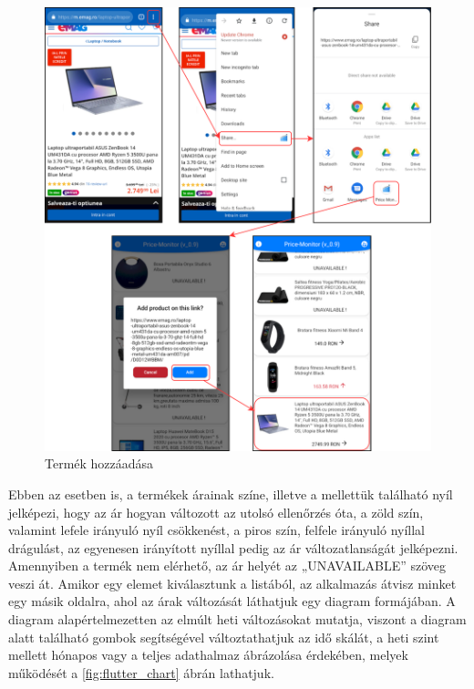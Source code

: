 \begin{figure}[H]
    \centering
    \includegraphics[scale=1]{figures/images/flutter_add.png}
    \caption{Termék hozzáadása}
    \label{fig:flutter_add}
\end{figure}

Ebben az esetben is, a termékek árainak színe, illetve a mellettük található nyíl jelképezi, hogy az ár hogyan változott az utolsó ellenőrzés óta, a zöld szín, valamint lefele irányuló nyíl csökkenést, a piros szín, felfele irányuló nyíllal drágulást, az egyenesen irányított nyíllal pedig az ár változatlanságát jelképezni. Amennyiben a termék nem elérhető, az ár helyét az „UNAVAILABLE” szöveg veszi át. Amikor egy elemet kiválasztunk a listából, az alkalmazás átvisz minket egy másik oldalra, ahol az árak változását láthatjuk egy diagram formájában. A diagram alapértelmezetten az elmúlt heti változásokat mutatja, viszont a diagram alatt található gombok segítségével változtathatjuk az idő skálát, a heti szint mellett hónapos vagy a teljes adathalmaz ábrázolása érdekében, melyek működését a \ref{fig:flutter_chart} ábrán lathatjuk.

